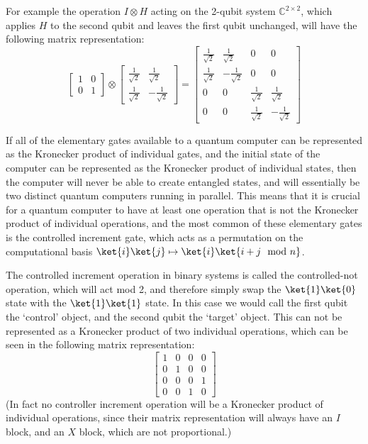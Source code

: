 For example the operation $I \otimes H$ acting on the 2-qubit system $\mathbb{C}^{2\times 2}$, which applies $H$ to the second qubit and leaves the first qubit unchanged, will have the following matrix representation:
\[
\left[\begin{matrix}
	1&0\\
	0&1
\end{matrix}\right]
\otimes
\left[\begin{matrix}
	\frac{1}{\sqrt{2}}&\frac{1}{\sqrt{2}}\\
	\frac{1}{\sqrt{2}}&-\frac{1}{\sqrt{2}}
\end{matrix}\right]
=
\left[\begin{matrix}
	\frac{1}{\sqrt{2}}&\frac{1}{\sqrt{2}}&0&0\\
	\frac{1}{\sqrt{2}}&-\frac{1}{\sqrt{2}}&0&0\\
	0&0&\frac{1}{\sqrt{2}}&\frac{1}{\sqrt{2}}\\
	0&0&\frac{1}{\sqrt{2}}&-\frac{1}{\sqrt{2}}
\end{matrix}\right]
\]

If all of the elementary gates available to a quantum computer can be represented as the Kronecker product of individual gates, and the initial state of the computer can be represented as the Kronecker product of individual states, then the computer will never be able to create entangled states, and will essentially be two distinct quantum computers running in parallel. This means that it is crucial for a quantum computer to have at least one operation that is not the Kronecker product of individual operations, and the most common of these elementary gates is the controlled increment gate, which acts as a permutation on the computational basis $\ket{i}\ket{j} \mapsto \ket{i}\ket{i+j \mod n}$.

The controlled increment operation in binary systems is called the controlled-not operation, which will act mod 2, and therefore simply swap the $\ket{1}\ket{0}$ state with the $\ket{1}\ket{1}$ state. In this case we would call the first qubit the `control' object, and the second qubit the `target' object. This can not be represented as a Kronecker product of two individual operations, which can be seen in the following matrix representation:
\[
\left[\begin{matrix}
1&0&0&0\\
0&1&0&0\\
0&0&0&1\\
0&0&1&0
\end{matrix}\right]
\]
(In fact no controller increment operation will be a Kronecker product of individual operations, since their matrix representation will always have an $I$ block, and an $X$ block, which are not proportional.)

